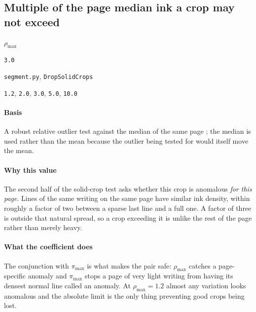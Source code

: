 \subsection{Multiple of the page median ink a crop may not exceed}

\label{coef:solid-median-ratio}

\begin{description}[leftmargin=5.2em,style=sameline]

\item[Symbol] $\rho_{\max}$

\item[Value] \texttt{3.0}

\item[Source] \texttt{segment.py}, \texttt{DropSolidCrops}

\item[Swept] \texttt{1.2}, \texttt{2.0}, \texttt{3.0}, \texttt{5.0}, \texttt{10.0}

\end{description}

\paragraph{Basis}

A robust relative outlier test against the median of the same page \cite{shafait2008}; the median is used rather than the mean because the outlier being tested for would itself move the mean.

\paragraph{Why this value}

The second half of the solid-crop test asks whether this crop is anomalous \emph{for this page}. Lines of the same writing on the same page have similar ink density, within roughly a factor of two between a sparse last line and a full one. A factor of three is outside that natural spread, so a crop exceeding it is unlike the rest of the page rather than merely heavy.

\paragraph{What the coefficient does}

The conjunction with $\pi_{\max}$ is what makes the pair safe: $\rho_{\max}$ catches a page-specific anomaly and $\pi_{\max}$ stops a page of very light writing from having its densest normal line called an anomaly. At $\rho_{\max} = 1.2$ almost any variation looks anomalous and the absolute limit is the only thing preventing good crops being lost.

